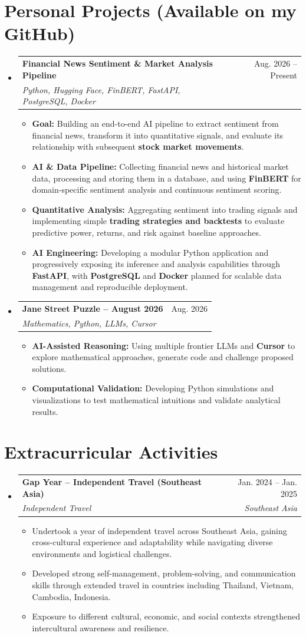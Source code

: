 \documentclass[letterpaper,10.6pt]{article}
\makeatletter
\newcommand{\resumeItem}[1]{
  \item\small{
    {#1 \vspace{-2pt}}
  }
}
\newcommand{\resumeSubheading}[4]{
  \vspace{-2pt}\item
    \begin{tabular*}{0.97\textwidth}[t]{l@{\extracolsep{\fill}}r}
      \textbf{#1} & #2 \\
      \textit{\small#3} & \textit{\small #4} \\
    \end{tabular*}\vspace{-7pt}
}
\newcommand{\resumeSubHeadingListStart}{\begin{itemize}[leftmargin=0.13in, label={}]}
\newcommand{\resumeSubHeadingListEnd}{\end{itemize}}
\newcommand{\resumeItemListStart}{\begin{itemize}}
\newcommand{\resumeItemListEnd}{\end{itemize}\vspace{-5pt}}
\makeatother
\begin{document}
\section{Personal Projects (Available on my GitHub)}
\resumeSubHeadingListStart
\resumeSubheading{Financial News Sentiment \& Market Analysis Pipeline}{Aug. 2026 -- Present}{Python, Hugging Face, FinBERT, FastAPI, PostgreSQL, Docker}{}
\resumeItemListStart
\resumeItem{\textbf{Goal: } Building an end-to-end AI pipeline to extract sentiment from financial news, transform it into quantitative signals, and evaluate its relationship with subsequent \textbf{stock market movements}.}
\resumeItem{\textbf{AI \& Data Pipeline: } Collecting financial news and historical market data, processing and storing them in a database, and using \textbf{FinBERT} for domain-specific sentiment analysis and continuous sentiment scoring.}
\resumeItem{\textbf{Quantitative Analysis: } Aggregating sentiment into trading signals and implementing simple \textbf{trading strategies and backtests} to evaluate predictive power, returns, and risk against baseline approaches.}
\resumeItem{\textbf{AI Engineering: } Developing a modular Python application and progressively exposing its inference and analysis capabilities through \textbf{FastAPI}, with \textbf{PostgreSQL} and \textbf{Docker} planned for scalable data management and reproducible deployment.}
\resumeItemListEnd

\resumeSubheading{Jane Street Puzzle -- August 2026}{Aug. 2026}{Mathematics, Python, LLMs, Cursor}{}
\resumeItemListStart
\resumeItem{\textbf{AI-Assisted Reasoning: } Using multiple frontier LLMs and \textbf{Cursor} to explore mathematical approaches, generate code and challenge proposed solutions.}
\resumeItem{\textbf{Computational Validation: } Developing Python simulations and visualizations to test mathematical intuitions and validate analytical results.}
\resumeItemListEnd
\resumeSubHeadingListEnd

\section{Extracurricular Activities}
    \resumeSubHeadingListStart
      \resumeSubheading
          {Gap Year – Independent Travel (Southeast Asia)}
{Jan. 2024 -- Jan. 2025}
          {Independent Travel }{Southeast Asia}
          \resumeItemListStart
            \resumeItem{Undertook a year of independent travel across Southeast Asia, gaining cross-cultural experience and adaptability while navigating diverse environments and logistical challenges.}
            \resumeItem{Developed strong self-management, problem-solving, and communication skills through extended travel in countries including Thailand, Vietnam, Cambodia, Indonesia.}
            \resumeItem{Exposure to different cultural, economic, and social contexts strengthened intercultural awareness and resilience.}
          \resumeItemListEnd
    \resumeSubHeadingListEnd
\end{document}
